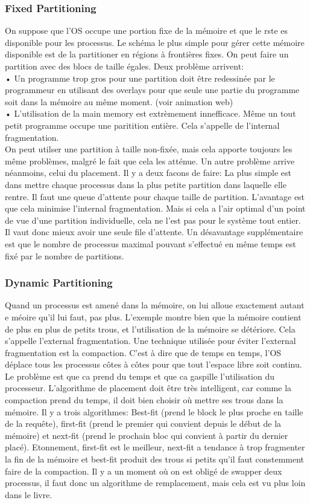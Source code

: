 \subsubsection{Fixed Partitioning}
On suppose que l'OS occupe une portion fixe de la mémoire et que le rste es disponible pour les processus.
Le schéma le plus simple pour gérer cette mémoire disponible est de la partitioner en régions à frontières fixes.
On peut faire un partition avec des blocs de taille égales.
Deux problème arrivent: \\
• Un programme trop gros pour une partition doit être redessinée par le programmeur en utilisant des overlays pour que seule une partie du programme soit dans la mémoire au même moment.
(voir animation web) \\
• L'utilisation de la main memory est extrèmement innefficace.
Même un tout petit programme occupe une paritition entière.
Cela s'appelle de l'internal fragmentation.
\\
On peut utilser une partition à taille non-fixée, mais cela apporte toujours les même problèmes, malgré le fait que cela les atténue.
Un autre problème arrive néanmoins, celui du placement.
Il y a deux facons de faire: La plus simple est dans mettre chaque processus dans la plus petite partition dans laquelle elle rentre.
Il faut une queue d'attente pour chaque taille de partition.
L'avantage est que cela minimise l'internal fragmentation.
Mais si cela a l'air optimal d'un point de vue d'une partition individuelle, cela ne l'est pas pour le système tout entier.
Il vaut donc mieux avoir une seule file d'attente.
Un désavantage supplémentaire est que le nombre de processus maximal pouvant s'effectué en même temps est fixé par le nombre de partitions.
\subsubsection{Dynamic Partitioning}
Quand un processus est amené dans la mémoire, on lui alloue exactement autant e méoire qu'il lui faut, pas plus.
L'exemple \cite[p.~314]{stallings} montre bien que la mémoire contient de plus en plus de petits trous, et l'utilisation de la mémoire se détériore.
Cela s'appelle l'external fragmentation.
Une technique utilisée pour éviter l'external fragmentation est la compaction.
C'est à dire que de temps en temps, l'OS déplace tous les processus côtes à côtes pour que tout l'espace libre soit continu.
Le problème est que ca prend du temps et que ca gaspille l'utilisation du processeur.
L'algorithme de placement doit être très intelligent, car comme la compaction prend du temps, il doit bien choisir où mettre ses trous dans la mémoire.
Il y a trois algorithmes: Best-fit (prend le block le plus proche en taille de la requête), first-fit (prend le premier qui convient depuis le début de la mémoire) et next-fit (prend le prochain bloc qui convient à partir du dernier placé).
Etonnement, first-fit est le meilleur, next-fit a tendance à trop fragmenter la fin de la mémoire et best-fit produit des trous si petits qu'il faut constemment faire de la compaction.
Il y a un moment où on est obligé de swapper deux processus, il faut donc un algorithme de remplacement, mais cela est vu plus loin dans le livre.
